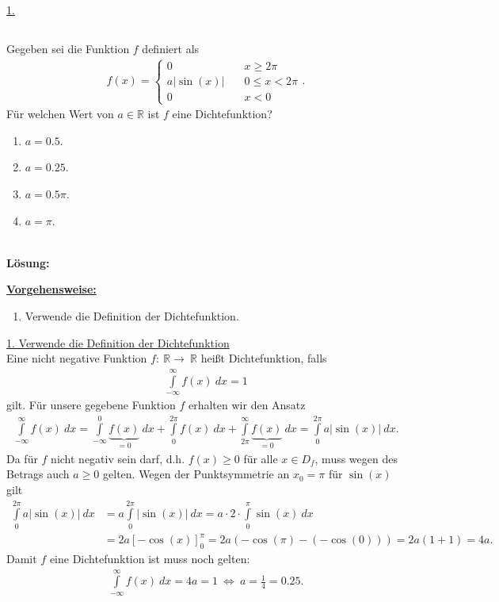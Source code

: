 \underline{1. }\\



\newpage
\subsection*{}
Gegeben sei die Funktion $f $ definiert als 
\begin{align*}
	f(x)
	=
	\begin{cases}
		0 \quad & x \geq 2 \pi\\
		a | \sin(x)  | \quad &0 \leq x < 2 \pi\\
		0 \quad &x<0
	\end{cases}.
\end{align*}
Für welchen Wert von $a \in \mathbb{R}$ ist $f$ eine Dichtefunktion?
\renewcommand{\labelenumi}{(\alph{enumi})}
\begin{enumerate}
	\item 
	$a = 0.5$.
	\item
	$a =0.25$.
	\item
	$a = 0.5 \pi $.
	\item
	$a = \pi$.
\end{enumerate}
\ \\
\textbf{Lösung:}
\begin{mdframed}
\underline{\textbf{Vorgehensweise:}}
\renewcommand{\labelenumi}{\theenumi.}
\begin{enumerate}
\item Verwende die Definition der Dichtefunktion.
\end{enumerate}
\end{mdframed}

\underline{1. Verwende die Definition der Dichtefunktion}\\
Eine nicht negative Funktion $f : \ \mathbb{R} \to \ \mathbb{R}$ heißt Dichtefunktion, falls
\begin{align*}
	\int \limits_{- \infty}^\infty f(x) \ dx = 1
\end{align*}
gilt. Für unsere gegebene Funktion $f$ erhalten wir den Ansatz 
\begin{align*}
	\int \limits_{- \infty}^\infty f(x) \ dx
	=
	\int \limits_{- \infty}^{0} \underbrace{f(x)}_{= 0} \ dx
	+
	\int \limits_{0}^{2 \pi} f(x) \ dx
	+
	\int \limits_{2 \pi}^\infty \underbrace{f(x)}_{= 0} \ dx
	=
	\int \limits_{0}^{2 \pi} a | \sin(x) | \ dx.
\end{align*}
Da für $f$ nicht negativ sein darf, d.h. $f(x) \geq 0$ für alle $x \in D_f$, muss wegen des Betrags auch $a \geq 0 $ gelten.
Wegen der Punktsymmetrie an $x_0  = \pi$ für $\sin(x)$ gilt
\begin{align*}
	\int \limits_{0}^{2 \pi} a | \sin(x) | \ dx
	&=
	a \int \limits_{0}^{2 \pi}  | \sin(x) | \ dx
	=
	a \cdot 2 \cdot  \int \limits_{0}^\pi \sin(x) \ dx\\
	&=
	2a \left[- \cos (x)\right]_{0}^\pi
	= 
	2a ( -\cos(\pi) - (- \cos(0)) )
	=
	2a ( 1 + 1 ) = 4a. 
\end{align*} 
Damit $f$ eine Dichtefunktion ist muss noch gelten: 
\begin{align*}
	\int \limits_{- \infty}^\infty f(x) \ dx  = 4a = 1  
	\ \Leftrightarrow \
	a = \frac{1}{4} = 0.25.
\end{align*}

